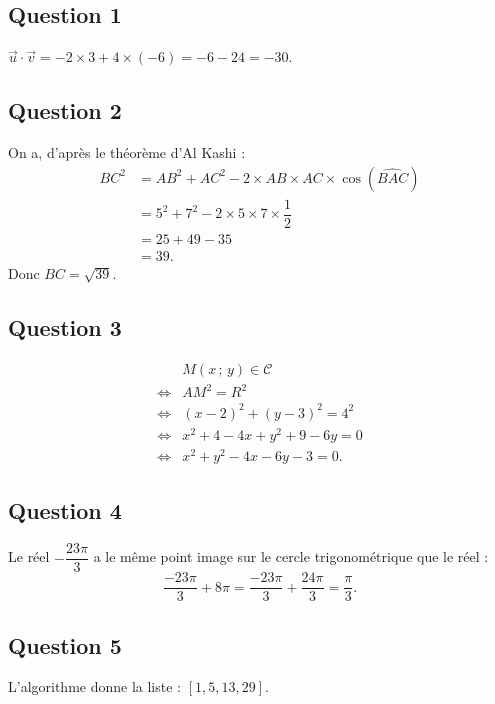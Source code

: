 \subsection*{Question 1}

\(\vec{u} \cdot \vec{v} = -2 \times 3 + 4 \times (-6) = -6 - 24 = -30\).

\subsection*{Question 2}

On a, d’après le théorème d’Al Kashi :
\begin{align*}
BC^2 &= AB^2 + AC^2 - 2 \times AB \times AC \times \cos(\widehat{BAC}) \\
&= 5^2 + 7^2 - 2 \times 5 \times 7 \times \dfrac{1}{2} \\
&= 25 + 49 - 35 \\
&= 39.
\end{align*}
Donc \(BC = \sqrt{39}\).

\subsection*{Question 3}

\begin{align*}
&M(x\,;\,y) \in \mathcal{C} \\
\iff &AM^2 = R^2 \\
\iff &(x - 2)^2 + (y - 3)^2 = 4^2 \\
\iff &x^2 + 4 - 4x + y^2 + 9 - 6y = 0 \\
\iff &x^2 + y^2 - 4x - 6y - 3 = 0.
\end{align*}

\subsection*{Question 4}

Le réel \(-\dfrac{23\pi}{3}\) a le même point image sur le cercle trigonométrique que le réel :
\[
\dfrac{-23\pi}{3} + 8\pi = \dfrac{-23\pi}{3} + \dfrac{24\pi}{3} = \dfrac{\pi}{3}.
\]

\subsection*{Question 5}

L’algorithme donne la liste : \([1, 5, 13, 29]\).
